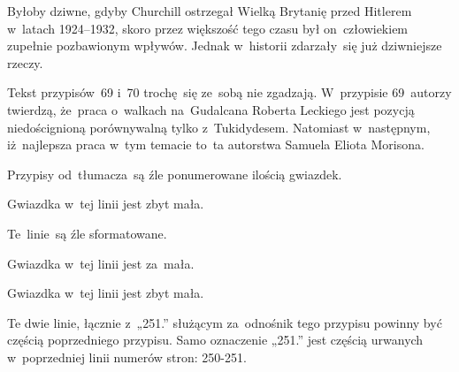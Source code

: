 \documentclass[a4paper,11pt]{article}
\numberwithin{equation}{section}
\begin{document}
\VerSpaceFour





\noindent
{} Byłoby dziwne, gdyby Churchill ostrzegał Wielką Brytanię przed
Hitlerem w~latach 1924--1932, skoro przez większość tego czasu był
on~człowiekiem zupełnie pozbawionym wpływów. Jednak w~historii zdarzały~się
już dziwniejsze rzeczy.

\VerSpaceFour





\noindent
{} Tekst przypisów~69 i~70 trochę~się ze~sobą nie zgadzają.
W~przypisie 69~autorzy twierdzą, że~praca o~walkach na~Gudalcana Roberta
Leckiego jest pozycją niedoścignioną porównywalną tylko z~Tukidydesem.
Natomiast w~następnym, iż~najlepsza praca w~tym temacie to~ta autorstwa
Samuela Eliota Morisona.

\VerSpaceFour





\noindent
{} Przypisy od~tłumacza~są źle ponumerowane ilością gwiazdek.

\VerSpaceFour





\noindent
{} Gwiazdka w~tej linii jest zbyt mała.

\VerSpaceFour





\noindent
{} Te~linie~są źle sformatowane.

\VerSpaceFour





\noindent
{} Gwiazdka w~tej linii jest za~mała.

\VerSpaceFour





\noindent
{} Gwiazdka w~tej linii jest zbyt mała.

\VerSpaceFour





\noindent
{} Te dwie linie, łącznie z~„251.” służącym za~odnośnik
tego przypisu powinny być częścią poprzedniego przypisu. Samo oznaczenie
„251.” jest częścią urwanych w~poprzedniej linii numerów stron: 250-251.

\VerSpaceFour
\end{document}
